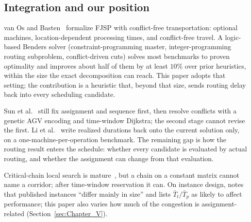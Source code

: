 \documentclass[manuscript,screen,review]{acmart}
\begin{document}
\subsection{Integration and our position}

van Os and Basten~\cite{vanos2026exact} formalize FJSP with conflict-free transportation: optional machines, location-dependent processing times, and conflict-free travel.
A logic-based Benders solver (constraint-programming master, integer-programming routing subproblem, conflict-driven cuts) solves most benchmarks to proven optimality and improves about half of them by at least $10\%$ over prior heuristics, within the size the exact decomposition can reach.
This paper adopts that setting; the contribution is a heuristic that, beyond that size, sends routing delay back into every scheduling candidate.

Sun et al.~\cite{sun2023integrated} still fix assignment and sequence first, then resolve conflicts with a genetic AGV encoding and time-window Dijkstra; the second stage cannot revise the first.
Li et al.~\cite{li2026framework} write realized durations back onto the current solution only, on a one-machine-per-operation benchmark.
The remaining gap is how the routing result enters the schedule: whether every candidate is evaluated by actual routing, and whether the assignment can change from that evaluation.

Critical-chain local search is mature~\cite{otala2021graph,tamssaouet2023neighborhood,qin2026knowledge}, but a chain on a constant matrix cannot name a corridor; after time-window reservation it can.
On instance design, \cite{xin2025review} notes that published instances ``differ mainly in size'' and lists $\bar{T}_t/\bar{T}_p$ as likely to affect performance; this paper also varies how much of the congestion is assignment-related (Section~\ref{sec:Chapter_V}).
\end{document}
